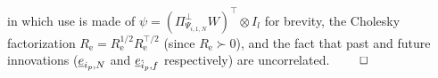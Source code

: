in which use is made of $\psi=(\Pi_{\Psi_{i,1,N}}^\bot W)^\top \otimes I_l$ for brevity, the Cholesky factorization $R_\mathrm{e}=R_\mathrm{e}^{1/2}R_\mathrm{e}^{\top/2}$ (since ${R_\mathrm{e}\succ0}$), and the fact that past and future innovations ($\underline{e}_{i_p,N}$ and $\underline{e}_{\hat{i}_p,f}$ respectively) are uncorrelated. $\hfill  \qed$
